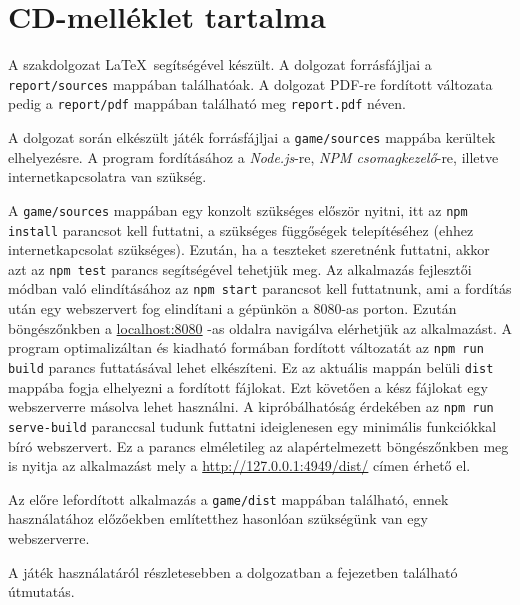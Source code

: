\newpage

\section*{CD-melléklet tartalma}

A szakdolgozat \LaTeX\ segítségével készült. A dolgozat forrásfájljai a \texttt{report/sources} mappában találhatóak.
A dolgozat PDF-re fordított változata pedig a \texttt{report/pdf} mappában található meg \texttt{report.pdf} néven.

A dolgozat során elkészült játék forrásfájljai a \texttt{game/sources} mappába kerültek elhelyezésre.
A program fordításához a \textit{Node.js}-re, \textit{NPM csomagkezelő}-re, illetve internetkapcsolatra van szükség.

A \texttt{game/sources} mappában egy konzolt szükséges először nyitni, itt az \texttt{npm install} parancsot kell futtatni, a szükséges függőségek telepítéséhez (ehhez internetkapcsolat szükséges).
Ezután, ha a teszteket szeretnénk futtatni, akkor azt az \texttt{npm test} parancs segítségével tehetjük meg.
Az alkalmazás fejlesztői módban való elindításához az \texttt{npm start} parancsot kell futtatnunk, ami a fordítás után egy webszervert fog elindítani a gépünkön a $8080$-as porton. Ezután böngészőnkben a \url{localhost:8080} -as oldalra navigálva elérhetjük az alkalmazást.
A program optimalizáltan és kiadható formában fordított változatát az \texttt{npm run build} parancs futtatásával lehet elkészíteni. Ez az aktuális mappán belüli \texttt{dist} mappába fogja elhelyezni a fordított fájlokat. Ezt követően a kész fájlokat egy webszerverre másolva lehet használni. A kipróbálhatóság érdekében az \texttt{npm run serve-build} paranccsal tudunk futtatni ideiglenesen egy minimális funkciókkal bíró webszervert. Ez a parancs elméletileg az alapértelmezett böngészőnkben meg is nyitja az alkalmazást mely a \url{http://127.0.0.1:4949/dist/} címen érhető el.

Az előre lefordított alkalmazás a \texttt{game/dist} mappában található, ennek használatához előzőekben említetthez hasonlóan szükségünk van egy webszerverre.

A játék használatáról részletesebben a dolgozatban a  fejezetben található útmutatás.
